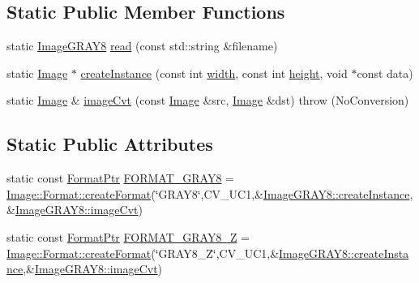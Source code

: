 \subsection*{Static Public Member Functions}
\begin{DoxyCompactItemize}
\item 
static \hyperlink{classcolorspaces_1_1_image_g_r_a_y8}{Image\+G\+R\+A\+Y8} \hyperlink{classcolorspaces_1_1_image_g_r_a_y8_ad9fcc69ca45375fcc7b76d2a154db966}{read} (const std\+::string \&filename)
\item 
static \hyperlink{classcolorspaces_1_1_image}{Image} $\ast$ \hyperlink{classcolorspaces_1_1_image_g_r_a_y8_a3bcae629fe8c73e5a9bd2cd0e77edbfa}{create\+Instance} (const int \hyperlink{classcolorspaces_1_1_image_ab80af7d4797110c23ed575b329ec7c4f}{width}, const int \hyperlink{classcolorspaces_1_1_image_a99a05ebd37f61215b2c3042ecaefdbfc}{height}, void $\ast$const data)
\item 
static \hyperlink{classcolorspaces_1_1_image}{Image} \& \hyperlink{classcolorspaces_1_1_image_g_r_a_y8_ab024b45fab4a6c62e1dce8872fd19e7f}{image\+Cvt} (const \hyperlink{classcolorspaces_1_1_image}{Image} \&src, \hyperlink{classcolorspaces_1_1_image}{Image} \&dst)  throw (\+No\+Conversion)
\end{DoxyCompactItemize}
\subsection*{Static Public Attributes}
\begin{DoxyCompactItemize}
\item 
static const \hyperlink{classcolorspaces_1_1_image_ab3978cc7acc2b5e855f8c715f09667d1}{Format\+Ptr} \hyperlink{classcolorspaces_1_1_image_g_r_a_y8_a9bfb4420590a581d76aaaffb3a22806a}{F\+O\+R\+M\+A\+T\+\_\+\+G\+R\+A\+Y8} = \hyperlink{classcolorspaces_1_1_image_1_1_format_ae79208f237b72cf596331ebcec2ff58b}{Image\+::\+Format\+::create\+Format}(\char`\"{}G\+R\+A\+Y8\char`\"{},C\+V\+\_\+U\+C1,\&\hyperlink{classcolorspaces_1_1_image_g_r_a_y8_a3bcae629fe8c73e5a9bd2cd0e77edbfa}{Image\+G\+R\+A\+Y8\+::create\+Instance},\&\hyperlink{classcolorspaces_1_1_image_g_r_a_y8_ab024b45fab4a6c62e1dce8872fd19e7f}{Image\+G\+R\+A\+Y8\+::image\+Cvt})
\item 
static const \hyperlink{classcolorspaces_1_1_image_ab3978cc7acc2b5e855f8c715f09667d1}{Format\+Ptr} \hyperlink{classcolorspaces_1_1_image_g_r_a_y8_af37dcabe8bbf5ef6f73ed790c88e4896}{F\+O\+R\+M\+A\+T\+\_\+\+G\+R\+A\+Y8\+\_\+Z} = \hyperlink{classcolorspaces_1_1_image_1_1_format_ae79208f237b72cf596331ebcec2ff58b}{Image\+::\+Format\+::create\+Format}(\char`\"{}G\+R\+A\+Y8\+\_\+Z\char`\"{},C\+V\+\_\+U\+C1,\&\hyperlink{classcolorspaces_1_1_image_g_r_a_y8_a3bcae629fe8c73e5a9bd2cd0e77edbfa}{Image\+G\+R\+A\+Y8\+::create\+Instance},\&\hyperlink{classcolorspaces_1_1_image_g_r_a_y8_ab024b45fab4a6c62e1dce8872fd19e7f}{Image\+G\+R\+A\+Y8\+::image\+Cvt})
\end{DoxyCompactItemize}
